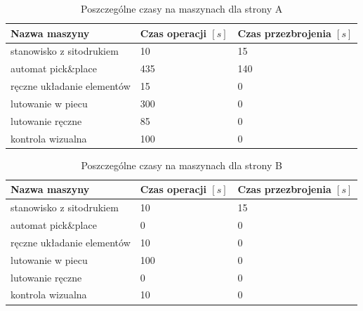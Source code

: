 \begin{table}[H]
	\centering
	\caption{Poszczególne czasy na maszynach dla strony A}
	\begin{tabular}{lll}
		\toprule
		Nazwa maszyny                 & Czas operacji $[s]$ & Czas przezbrojenia $[s]$ \\
		\midrule
		stanowisko z sitodrukiem      & 10                  & 15                       \\
		automat pick\&place           & 435                 & 140                      \\
		ręczne układanie elementów & 15                  & 0                        \\
		lutowanie w piecu             & 300                 & 0                        \\
		lutowanie ręczne             & 85                  & 0                        \\
		kontrola wizualna             & 100                 & 0                        \\
		\bottomrule
	\end{tabular}
\end{table}

\begin{table}[H]
	\centering
	\caption{Poszczególne czasy na maszynach dla strony B}
	\begin{tabular}{lll}
		\toprule
		Nazwa maszyny                 & Czas operacji $[s]$ & Czas przezbrojenia $[s]$ \\
		\midrule
		stanowisko z sitodrukiem      & 10                  & 15                       \\
		automat pick\&place           & 0                   & 0                        \\
		ręczne układanie elementów & 10                  & 0                        \\
		lutowanie w piecu             & 100                 & 0                        \\
		lutowanie ręczne             & 0                   & 0                        \\
		kontrola wizualna             & 10                  & 0                        \\
		\bottomrule
	\end{tabular}
\end{table}


